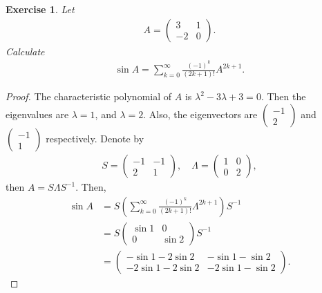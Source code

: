 \documentclass[10pt]{book}
\newtheorem{exercise}{Exercise}[section]
\theoremstyle{definition}
\numberwithin{equation}{chapter}
\begin{document}
\begin{exercise}
Let
\begin{align*}
    A = \begin{pmatrix} 
        3 & 1 \\ 
        -2 & 0 
    \end{pmatrix}.
\end{align*}
Calculate 
\begin{align*}
    \sin A = \sum^\infty_{k=0} \frac{(-1)^k}{(2k+1)!}A^{2k+1}.
\end{align*}
\end{exercise}
\begin{proof}
The characteristic polynomial of $A$ is $\lambda^2 - 3\lambda + 3 = 0$. Then the eigenvalues are $\lambda = 1$, and $\lambda = 2$. Also, the eigenvectors are $\begin{pmatrix} -1 \\ 2 \end{pmatrix}$ and $\begin{pmatrix} -1 \\ 1 \end{pmatrix}$ respectively. Denote by 
\begin{align*}
    S = \begin{pmatrix} 
        -1 & -1 \\ 
        2 & 1 
    \end{pmatrix}, \quad \Lambda = \begin{pmatrix} 
        1 & 0 \\ 
        0 & 2 
    \end{pmatrix},
\end{align*}
then $A = S \Lambda S^{-1}$. Then,
\begin{align*}
    \sin A & = S \left(\sum^\infty_{k=0}  \frac{(-1)^k}{(2k+1)!} \Lambda^{2k+1} \right) S^{-1} \\
    & = S \begin{pmatrix} 
        \sin 1 & 0 \\ 
        0 & \sin 2 
    \end{pmatrix} S^{-1} \\
    & = \begin{pmatrix} 
        -\sin 1 - 2\sin 2 & -\sin 1 - \sin 2 \\ 
        -2\sin 1 - 2\sin 2 & -2\sin 1 - \sin 2
    \end{pmatrix}.
\end{align*}
\end{proof}

\medskip
\end{document}

